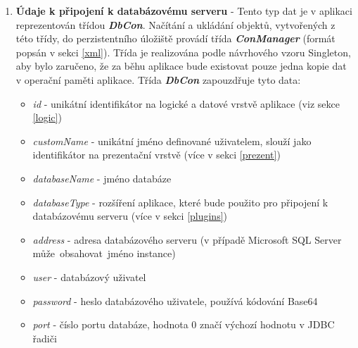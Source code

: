 \documentclass[czech,bachelor,public,dept460,male,cpdeclaration,twoside]{diploma}
\begin{document}
\begin{enumerate}
  \item \textbf{Údaje k připojení k databázovému serveru} - Tento typ dat je v aplikaci reprezentován třídou \textbf{\emph{DbCon}}. Načítání a ukládání objektů, vytvořených z této třídy, do perzistentního úložiště provádí třída \textbf{\emph{ConManager}} (formát popsán v sekci \ref{xml}). Třída je realizována podle návrhového vzoru Singleton, aby bylo zaručeno, že za běhu aplikace bude existovat pouze jedna kopie dat v operační paměti aplikace. Třída \textbf{\emph{DbCon}} zapouzdřuje tyto data:
\begin{itemize}
  	\item \textit{id} - unikátní identifikátor na logické a datové vrstvě aplikace (viz sekce \ref{logic})
  	\item \textit{customName} - unikátní jméno definované uživatelem, slouží jako identifikátor na prezentační vrstvě (více v sekci \ref{prezent})
  	\item \textit{databaseName} - jméno databáze
  	\item \textit{databaseType} - rozšíření aplikace, které bude použito pro připojení k databázovému serveru (více v sekci \ref{plugins})
  	\item \textit{address} - adresa databázového serveru (v případě Microsoft SQL Server může~obsahovat~jméno instance)
  	\item \textit{user} - databázový uživatel
  	\item \textit{password} - heslo databázového uživatele, používá kódování Base64
  	\item \textit{port} - číslo portu databáze, hodnota 0 značí výchozí hodnotu v JDBC řadiči
\end{itemize}
  

\end{enumerate}
\end{document}

